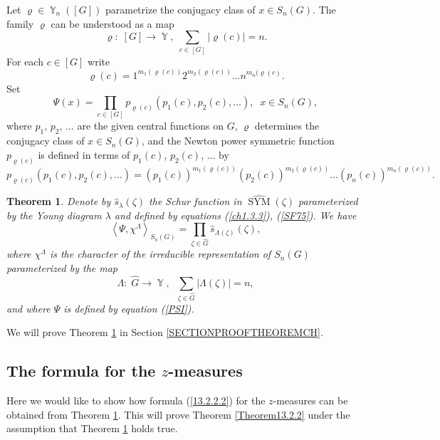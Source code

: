 \documentclass[12pt]{amsart}
\newtheorem{thm}{Theorem}[section]
\theoremstyle{definition}
\numberwithin{equation}{section}
\DeclareMathOperator{\SYM}{SYM}
\DeclareMathOperator{\Y}{\mathbb{Y}}
\begin{document}
Let $\varrho\in\Y_n\left([G]\right)$ parametrize the conjugacy class
of $x\in S_n(G)$. The family $\varrho$ can be understood as a map
$$
\varrho:\;[G]\longrightarrow\Y,\;
\sum\limits_{c\in [G]}|\varrho(c)|=n.
$$
For each $c\in[G]$ write
$$
\varrho(c)=1^{m_1(\varrho(c))}2^{m_2(\varrho(c))}\ldots n^{m_n(\varrho(c)}.
$$
Set
\begin{equation}\label{PSI}
\Psi(x)=\prod\limits_{c\in[G]}p_{\varrho(c)}\left(p_1(c),p_2(c),\ldots\right),\;\; x\in S_n(G),
\end{equation}
where $p_1$, $p_2$, $\ldots$ are the given central functions on $G$,
$\varrho$ determines the conjugacy class of $x\in S_n(G)$, and the Newton power symmetric function $p_{\varrho(c)}$ is defined in terms of $p_1(c)$, $p_2(c)$, $\ldots$
by
\begin{equation}\label{ch1.2.1}
p_{\varrho(c)}\left(p_1(c),p_2(c),\ldots\right)=(p_1(c))^{m_1(\varrho(c))}(p_2(c))^{m_2(\varrho(c))}\ldots (p_n(c))^{m_n(\varrho(c))}.
\end{equation}
\begin{thm}\label{Theoremch1.3.2}
Denote by $\widehat{s}_{\lambda}(\zeta)$ the Schur function in
$\widehat{\SYM}(\zeta)$ parameterized by the Young diagram $\lambda$ and defined by equations (\ref{ch1.3.3}), (\ref{SF75}).
We have
\begin{equation}\label{ch1.3.4}
\left<\Psi,\chi^{\Lambda}\right>_{S_n(G)}=\prod\limits_{\zeta\in\widehat{G}}\widehat{s}_{\Lambda(\zeta)}(\zeta),
\end{equation}
where $\chi^{\Lambda}$ is the character of the irreducible representation of $S_n(G)$ parameterized by the map
$$
\Lambda:\;\widehat{G}\longrightarrow\Y,\;\;\sum\limits_{\zeta\in\widehat{G}}|\Lambda(\zeta)|=n,
$$
and where $\Psi$ is defined by equation (\ref{PSI}).
\end{thm}
We will prove Theorem \ref{Theoremch1.3.2} in Section \ref{SECTIONPROOFTHEOREMCH}.
\subsection{The formula for the $z$-measures}
Here we would like to show how  formula (\ref{13.2.2.2}) for the $z$-measures can be obtained from Theorem \ref{Theoremch1.3.2}. This will prove Theorem \ref{Theorem13.2.2}  under the assumption that
Theorem \ref{Theoremch1.3.2} holds true.
\end{document}
